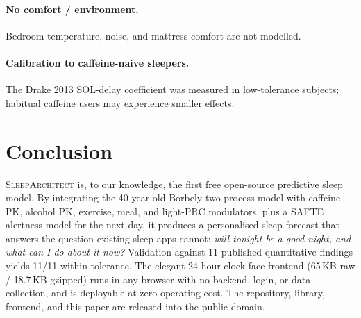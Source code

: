 \documentclass[10pt,twocolumn]{article}
\begin{document}
\paragraph{No comfort / environment.}  Bedroom temperature,
noise, and mattress comfort are not modelled.

\paragraph{Calibration to caffeine-naive sleepers.}  The Drake 2013
SOL-delay coefficient was measured in low-tolerance subjects;
habitual caffeine users may experience smaller effects.

\section{Conclusion}

\textsc{SleepArchitect} is, to our knowledge, the first free
open-source predictive sleep model.  By integrating the
40-year-old Borbely two-process model with caffeine PK, alcohol PK,
exercise, meal, and light-PRC modulators, plus a SAFTE alertness
model for the next day, it produces a personalised sleep forecast
that answers the question existing sleep apps cannot: \emph{will
tonight be a good night, and what can I do about it now?}
Validation against 11 published quantitative findings yields 11/11
within tolerance.  The elegant 24-hour clock-face frontend
(65\,KB raw / 18.7\,KB gzipped) runs in any browser with no backend,
login, or data collection, and is deployable at zero operating cost.
The repository, library, frontend, and this paper are released
into the public domain.


\end{document}
